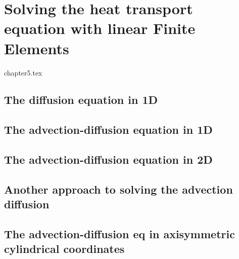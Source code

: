 \chapter{Solving the heat transport equation with linear Finite Elements \label{chapt5}} %

\begin{flushright} {\tiny {\color{gray} chapter5.tex}} \end{flushright}

\section{The diffusion equation in 1D} \label{sec:diff1D}  %
\section{The advection-diffusion equation in 1D} \label{sec:advec-diff1D} %
\section{The advection-diffusion equation in 2D} \label{ss:hte_fem} %
\section{Another approach to solving the advection diffusion}\label{ss:hte_diff} 
\section{The advection-diffusion eq in axisymmetric cylindrical coordinates}\label{ss:hte_axisym} 
